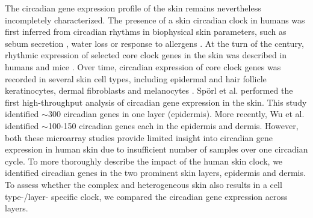 The circadian gene expression profile of the skin remains nevertheless incompletely characterized. The presence of a skin circadian clock in humans was first inferred from circadian rhythms in biophysical skin parameters, such as sebum secretion \cite{Burton1970}, water loss \cite{Spruit1971} or response to allergens \cite{Reinberg1965}. At the turn of the century, rhythmic expression of selected core clock genes in the skin was described in humans \cite{Bjarnason2001} and mice \cite{Oishi2002}. Over time, circadian expression of core clock genes was recorded in several skin cell types, including epidermal and hair follicle keratinocytes, dermal fibroblasts and melanocytes \cite{Zanello2000, Kawara2002, Brown2005, Brown2008,Spoerl2011}. Sp\"orl et al. \cite{Spoerl2012} performed the first high-throughput analysis of circadian gene expression in the skin. This study identified $\sim$300 circadian genes in one layer (epidermis). More recently, Wu et al. \cite{Wu2018,Wu2020} identified $\sim$100-150 circadian genes each in the epidermis and dermis. However, both these microarray studies provide limited insight into circadian gene expression in human skin due to insufficient number of samples over one circadian cycle. To more thoroughly describe the impact of the human skin clock, we identified circadian genes in the two prominent skin layers, epidermis and dermis. To assess whether the complex and heterogeneous skin also results in a cell type-/layer- specific clock, we compared the circadian gene expression across layers. 

